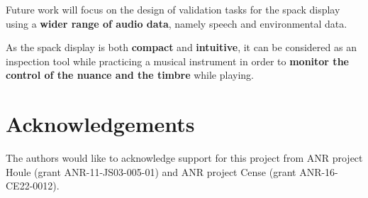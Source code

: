 \documentclass[a0,portrait,15pt]{a0poster}
\begin{document}
\begin{multicols}{2}
Future work will focus on the design of validation tasks for the spack display using a \textbf{wider range of audio data}, namely speech and environmental data.

As the spack display is both \textbf{compact} and \textbf{intuitive}, it can be considered as an inspection tool while practicing a musical instrument in order to \textbf{monitor the control of the nuance and the timbre} while playing.




\section*{Acknowledgements}


The authors would like to acknowledge support for this project
from ANR project Houle (grant ANR-11-JS03-005-01) and ANR project Cense (grant ANR-16-CE22-0012).


\end{multicols}
\end{document}
